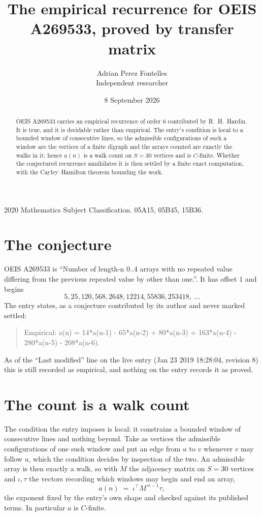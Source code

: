 \documentclass[11pt,a4paper]{article}
\title{The empirical recurrence for OEIS A269533, proved by transfer matrix}
\author{Adrian Perez Fontelles\\ \small Independent researcher}
\date{8 September 2026}
\theoremstyle{plain}
\theoremstyle{definition}
\begin{document}
\maketitle

\begin{abstract}
OEIS A269533 carries an empirical recurrence of order $6$ contributed by R.~H.~Hardin. It is
true, and it is decidable rather than empirical. The entry's condition is local to a bounded window of consecutive lines, so
the admissible configurations of such a window are the vertices of a finite digraph and the
arrays counted are exactly the walks in it; hence $a(n)$ is a walk count on $S=30$ vertices
and is $C$-finite. Whether the conjectured recurrence annihilates it is then settled by a
finite exact computation, with the Cayley--Hamilton theorem bounding the work.
\end{abstract}

\noindent\small 2020 Mathematics Subject Classification. 05A15, 05B45, 15B36.\normalsize

\section{The conjecture}

OEIS A269533 is ``Number of length-n 0..4 arrays with no repeated value differing from the previous repeated value by other than one.''. It has offset $1$ and begins
\[
5, 25, 120, 568, 2648, 12214, 55836, 253418,\ \dots
\]
The entry states, as a conjecture contributed by its author and never marked settled:
\begin{quote}
Empirical: a(n) = 14*a(n-1) - 65*a(n-2) + 80*a(n-3) + 163*a(n-4) - 280*a(n-5) - 208*a(n-6).
\end{quote}
As of the ``Last modified'' line on the live entry (Jan 23 2019 18:28:04, revision 8) this is still
recorded as empirical, and nothing on the entry records it as proved.

\section{The count is a walk count}

The condition the entry imposes is local: it constrains a bounded window of consecutive lines and nothing beyond. Take as
vertices the admissible configurations of one such window and put an edge from $u$ to $v$
whenever $v$ may follow $u$, which the condition decides by inspection of the two. An
admissible array is then exactly a walk, so with $M$ the adjacency matrix on $S=30$ vertices
and $\iota,\tau$ the vectors recording which windows may begin and end an array,
\[
a(n)\;=\;\iota^{\!\top}M^{\,n-1}\tau ,
\]
the exponent fixed by the entry's own shape and checked against its published terms. In
particular $a$ is $C$-finite.
\end{document}
